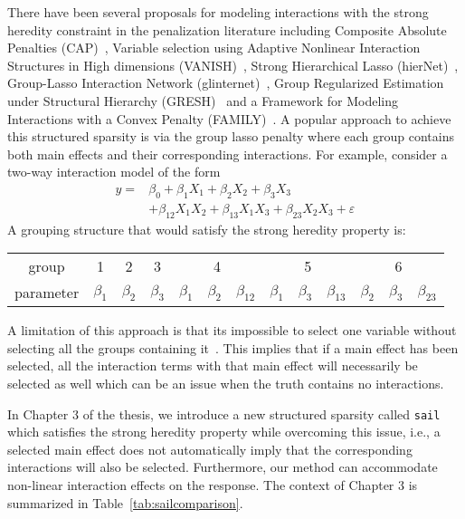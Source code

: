 There have been several proposals for modeling interactions with the strong heredity constraint in the penalization literature including Composite Absolute Penalties (CAP)~\citep{zhao2009composite}, Variable selection using Adaptive Nonlinear Interaction Structures in High dimensions (VANISH)~\citep{radchenko2010variable}, Strong Hierarchical Lasso (hierNet)~\citep{bien2013lasso}, Group-Lasso Interaction Network (glinternet)~\citep{lim2015learning}, Group Regularized Estimation under Structural Hierarchy (GRESH)~\citep{she2014group} and a Framework for Modeling Interactions with a Convex Penalty (FAMILY)~\citep{haris2014convex}. A popular approach to achieve this structured sparsity is via the group lasso penalty where each group contains both main effects and their corresponding interactions. For example, consider a two-way interaction model of the form
\begin{align*}
y = &\beta_0 + \beta_1 X_1 + \beta_2 X_2 + \beta_3 X_3 \\
&+ \beta_{12} X_1 X_2 + \beta_{13} X_1X_3 + \beta_{23} X_2X_3 + \varepsilon
\end{align*}
A grouping structure that would satisfy the strong heredity property is:
\begin{table}[H]
	\centering
	\begin{tabular}{|c|c|c|c|ccc|ccc|ccc|}
		\hline
		group     & 1         & 2         & 3         & \multicolumn{3}{c|}{4}            & \multicolumn{3}{c|}{5}            & \multicolumn{3}{c|}{6}            \\
		parameter & $\beta_1$ & $\beta_2$ & $\beta_3$ & $\beta_1$ & $\beta_2$ & $\beta_{12}$ & $\beta_1$ & $\beta_3$ & $\beta_{13}$ & $\beta_2$ & $\beta_3$ & $\beta_{23}$ \\ \hline
	\end{tabular}
\end{table}
A limitation of this approach is that its impossible to select one variable without selecting all the groups containing it~\citep{jacob2009group}. This implies that if a main effect has been selected, all the interaction terms with that main effect will necessarily be selected as well which can be an issue when the truth contains no interactions. 

In Chapter 3 of the thesis, we introduce a new structured sparsity called \texttt{sail} which satisfies the strong heredity property while overcoming this issue, i.e., a selected main effect does not automatically imply that the corresponding interactions will also be selected. Furthermore, our method can accommodate non-linear interaction effects on the response. The context of Chapter 3 is summarized in Table~\ref{tab:sailcomparison}.

